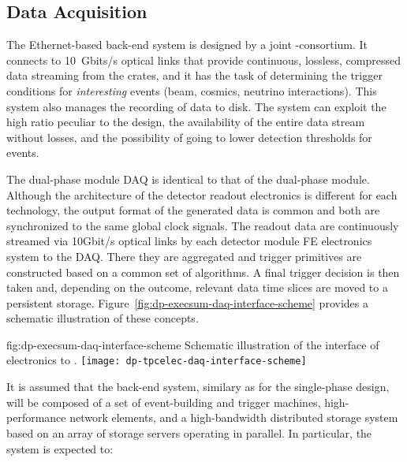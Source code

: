 \subsection{Data Acquisition}
\label{sec:dp-execsum-daq}

The Ethernet-based  back-end system is designed by a joint \single{}-\dual consortium. It connects to 
\SI{10}{Gbits/s} optical links that provide continuous, lossless, compressed data streaming from the  crates, and it has the task of determining the trigger conditions for \textit{interesting} events (beam, cosmics,  neutrino interactions). This system also manages the recording of data to disk. The system can exploit the high  ratio peculiar to the \dual design, the availability of the entire data stream without losses, and the possibility of going to lower detection thresholds for  events.

The dual-phase module DAQ is identical to that of the dual-phase module. Although the architecture of the detector readout electronics is different for each technology, the output format of the generated data is common and both are synchronized to the same global clock signals. The readout data are continuously streamed via 10Gbit/s optical links by each detector module FE electronics system to the DAQ. There they are aggregated and trigger primitives are constructed based on a common set of algorithms. A final trigger decision is then taken and, depending on the outcome, relevant data time slices are moved to a persistent storage. Figure~\ref{fig:dp-execsum-daq-interface-scheme} provides a schematic illustration of these concepts.
  

\begin{dunefigure}{fig:dp-execsum-daq-interface-scheme}
{Schematic illustration of the interface of   electronics to .}
\texttt{[image: dp-tpcelec-daq-interface-scheme]}
\end{dunefigure}

 It  is assumed that the  back-end system, similary as for the single-phase design, will be composed of a set of event-building and trigger machines, high-performance network elements, and a high-bandwidth distributed storage system based on an array of storage servers operating in parallel. In particular, the  system is expected to:

